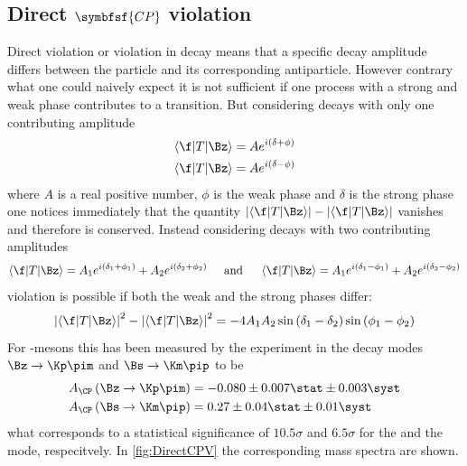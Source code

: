 \subsection[head={Direct \CP violation},tocentry={Direct \CP violation}]{Direct $\symbfsf{C{}P}$ violation}
\label{sec:DirectCPV}

Direct \CP violation or \CP violation in decay means that a specific decay amplitude differs between the particle and  its corresponding antiparticle.
However contrary what one could naively expect it is not sufficient if one process with a strong and weak phase contributes to a transition.
But considering decays with only one contributing amplitude
\begin{equation}
\begin{split}
\left<\f|T|\Bz\right>&=Ae^{i\left(\delta+\phi\right)}\\
\left<\f|T|\Bz\right>&=Ae^{i\left(\delta-\phi\right)}
\end{split}
\end{equation}
where $A$ is a real positive number, $\phi$ is the weak phase and $\delta$ is the strong phase one notices immediately that the quantity $\left|\left<\f|T|\Bz\right>\right|-\left|\left<\f|T|\Bz\right>\right|$ vanishes and therefore \CP is conserved.
Instead considering decays with two contributing amplitudes
\begin{equation}
\left<\f|T|\Bz\right>=A_1e^{i\left(\delta_1+\phi_1\right)}+A_2e^{i\left(\delta_2+\phi_2\right)}\hspace{0.5cm}\text{and}\hspace{0.5cm}\left<\f|T|\Bz\right>=A_1e^{i\left(\delta_1-\phi_1\right)}+A_2e^{i\left(\delta_2-\phi_2\right)}
\end{equation}
\CP violation is possible if both the weak and the strong phases differ:
\begin{equation}
\left|\left<\f|T|\Bz\right>\right|^2-\left|\left<\f|T|\Bz\right>\right|^2=-4A_1A_2\sin\left(\delta_1-\delta_2\right)\sin\left(\phi_1-\phi_2\right)
\end{equation}
For \B-mesons this has been measured by the \lhcb experiment in the decay modes $\Bz\to\Kp\pim$ and $\Bs\to\Km\pip$ \cite{LHCb-PAPER-2013-018} to be
\begin{equation}
\begin{split}
A_{\CP}\left(\Bz\to\Kp\pim\right) &= -0.080\pm0.007\stat \pm 0.003\syst\\
A_{\CP}\left(\Bs\to\Km\pip\right) &= 0.27\pm0.04\stat \pm 0.01\syst
\end{split}
\end{equation}
what corresponds to a statistical significance of $10.5\sigma$ and $6.5\sigma$ for the \Bz and the \Bs mode, respecitvely.
In \cref{fig:DirectCPV} the corresponding mass spectra are shown.

